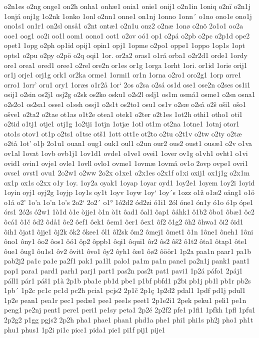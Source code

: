 o2n1es
o2ng
onge1
on2h
onha1
onhæ1
onia1
onie1
onij1
o2n1in
1oniq
o2nï
o2n1j
1onjá
onj1g
1o2nk
1onko
1onl
o2nn1
onne1
on1nj
1onno
1onn´
o1no
ono1e
ono1j
ono1s1
on1r1
on2sl
onså1
o2nt
ontæ1
o2n1u
onz2
o2næ
1onø
o2nö
2o1o1
oo2a
ooe1
oog1
oo2i
oo1l
oom1
oono1
oot1
o2ov
oó1
op1
o2pá
o2pb
o2pc
o2p1d
ope2
opet1
1opg
o2ph
op1id
opij1
opin1
opj1
1opme
o2po1
oppe1
1oppo
1op1s
1opt
opts1
o2pu
o2py
o2pö
o2q
oqi1
1or.
or2a2
oras1
o1rá
orba1
o2r2d1
orde1
1ordy
ore1
orea1
ored1
oree1
o2rel
ore2n
or1es
or1g
1orga
1orht
1ori.
or1id
1orie
orij1
or1j
orje1
orj1g
ork1
or2ka
orme1
1ormi1
or1n
1orna
o2ro1
oro2g1
1orp
orre1
orro1
1orr'
oru1
ory1
1oræs
o1r2å
1or`
2os
o2sa
o2sá
os1d
ose1
ose2n
o2ses
os1i1
osij1
o2sin
os2j1
osj2g
o2sk
os2ko
osku1
o2s2l
oslj1
os1m
osmá1
osme1
o2sn
osna1
o2s2o1
os2sa1
osse1
o1ssh
ossj1
o2s1t
os2to1
osu1
os1v
o2sæ
o2så
o2š
oši1
ošo1
ošve1
o2ta2
o2tae
ot1as
o1t2e
otea1
otek1
o2ter
o2t1es
1ot2h
othi1
otho1
oti1
o2tid
o1tj1
otje1
otj1g
1o2tji
1otjn
1otjæ
1otl
ot1m
ot2na
1otne1
1otnj
otor1
oto1s
otov1
ot1p
o2ts1
o1tse
otš1
1ott
ott1e
ot2to
o2tu
o2t1v
o2tw
o2ty
o2tæ
o2tå
1ot'
o1þ
2o1u1
ouan1
oug1
ouk1
oul1
o2un
our2
ous2
oust1
ousæ1
o2v
o1va
ov1al
1ovat
1ovb
ovb1j1
1ov1d1
ovde1
o1ve1
ovei1
1over
ov1g
o1vh1
ovht1
o1vi
ovid1
ovin1
ovje1
ovle1
1ovll
ovlo1
ovme1
1ovmæ
1ovmå
ov1o
2ovp
ovpe1
ovri1
ovse1
ovst1
ovu1
2o2w1
o2ww
2o2x
o1xe1
o2x1es
o2x1f
o1xi
oxij1
ox1j1g
o2x1m
ox1p
ox1s
o2xx
o1y
1oy.
1oy2a
oyak1
1oyap
1oyar
oyd1
1oy2e1
1oyem
1oy2i
1oyid
1oyin
oyj1
oyj2g
1oyjp
1oy1s
oy1t
1oyv
1oyw
1oy`
1oy´s
1ozz
o1ž
o1æ2
oäng1
o1ö
o1å
o2'
1o'a
1o'n
1o's
2o2`
2o2´
o1°
1ó2d2
ód2zi
ó1i1
2ól
óne1
ón1y
ó1o
ó1p
ópe1
órs1
2ó2s
ó2w1
1ò1d
ò1e
òjje1
ò1n
ò1t
ôad1
ôal1
ôap1
ôáhk1
ô1b2
ôbo1
ôbæ1
ôc2
ôcá1
ô1č
ôd2
ôdå1
ôe2
ôef1
ôek1
ôem1
ôer1
ôex1
ôf2
ô1g2
ôh2
ôhwa1
ôi2
ôid1
ôih1
ôjat1
ôjje1
ôj2k
ôk2
ôkee1
ôl1
ôl2sk
ôm2
ômej1
ômet1
ô1n
1ône1
ôneh1
1ôni
ôno1
ôny1
ôo2
ôos1
ôó1
ôp2
ôppb1
ôqi1
ôqui1
ôr2
ôs2
ôš2
ô1t2
ôta1
ôtap1
ôte1
ôue1
ôug1
ôu1s1
ôv2
ôvit1
ôvo1
ôy2
ôyh1
ôæ1
ôø2
ôöör1
1p2a
paa1n
paar1
pa1b
pab2j2
pa1c
pa1e
pa2f1
pak1
pa1l1
palo1
pa1m
pa1n
pane1
pa2n1j
pank1
pant1
pap1
para1
pard1
parh1
parj1
part1
pas2n
pas2t
pat1
pavi1
1p2á
páfo1
2páj1
páll1
pár1
páš1
p1à
2p1b
pba1e
pb1d
pbe1
p1bf
pbfd1
p2bi
pb1j
pb1l
pb1r
pb2s
1pb´
1p2c
pc1c
pc1d
pc2h
pcia1
pcjs2
2p1č
2p1ç
1p2d2
pdal1
1pdf
pd1j
pdul1
1p2e
pean1
pea1r
pec1
pedæ1
pee1
pee1s
peet1
2p1e2i1
2pek
peku1
peli1
pe1n
peng1
pe2nj
pent1
pere1
peri1
pe1sy
peta1
2p2é
2p2f2
pfe1
p1fi1
1pfkh
1pfl
1pfu1
2p2g2
p1gg
pgjs2
2p2h
pha1
phae1
phan1
phd1a
phe1
phi1
phi1s
ph2j
pho1
ph1t
phu1
phus1
1p2i
pi1c
picc1
pida1
pie1
pi1f
pij1
pije1
